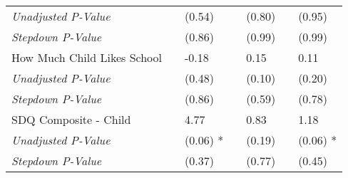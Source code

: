 \begin{tabular}{L{9cm} L{1cm} l L{1cm} l l l}
\quad \textit{Unadjusted P-Value} & & (0.54)  & & (0.80)  & & (0.95) \\
\quad \textit{Stepdown P-Value} & & (0.86)  & & (0.99)  & & (0.99) \\[3pt]
How Much Child Likes School & & -0.18 & & 0.15  & & 0.11 \\
\quad \textit{Unadjusted P-Value} & & (0.48)  & & (0.10)  & & (0.20) \\
\quad \textit{Stepdown P-Value} & & (0.86)  & & (0.59)  & & (0.78) \\[3pt]
SDQ Composite - Child & & 4.77 & & 0.83  & & 1.18 \\
\quad \textit{Unadjusted P-Value} & & (0.06) * & & (0.19)  & & (0.06) * \\
\quad \textit{Stepdown P-Value} & & (0.37)  & & (0.77)  & & (0.45) \\[3pt]
\bottomrule
\end{tabular}
